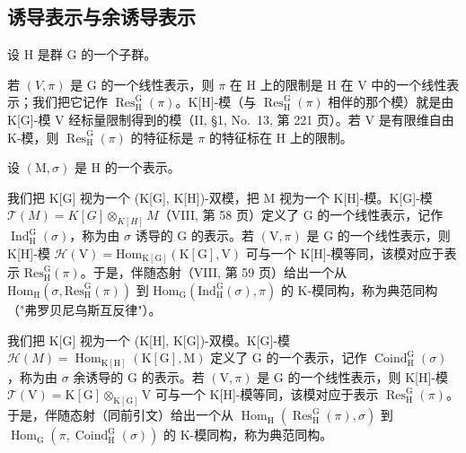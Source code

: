 \subsection{诱导表示与余诱导表示}

设 H 是群 G 的一个子群。

若 \((V,\pi)\) 是 G 的一个线性表示，则 \(\pi\) 在 H 上的限制是 H 在 V 中的一个线性表示；我们把它记作 \(\operatorname{Res}_{\mathrm{H}}^{\mathrm{G}}(\pi)\)。K{[}H{]}-模（与 \(\operatorname{Res}_{\mathrm{H}}^{\mathrm{G}}(\pi)\) 相伴的那个模）就是由 K{[}G{]}-模 V 经标量限制得到的模（II, §1, No.~13, 第 221 页）。若 V 是有限维自由 K-模，则 \(\operatorname{Res}_{\mathrm{H}}^{\mathrm{G}}(\pi)\) 的特征标是 \(\pi\) 的特征标在 H 上的限制。

设 \((\mathrm{M},\sigma)\) 是 H 的一个表示。

我们把 K{[}G{]} 视为一个 (K{[}G{]}, K{[}H{]})-双模，把 M 视为一个 K{[}H{]}-模。K{[}G{]}-模 \(\mathcal{T}(M) = K[G] \otimes_{K[H]} M\)（VIII, 第 58 页）定义了 G 的一个线性表示，记作 \(\operatorname{Ind}_{\mathrm{H}}^{\mathrm{G}}(\sigma)\)，称为由 \(\sigma\) 诱导的 G 的表示。若 \((\mathrm{V}, \pi)\) 是 G 的一个线性表示，则 K{[}H{]}-模 \(\mathcal{H}(\mathrm{V}) = \mathrm{Hom}_{\mathrm{K[G]}}(\mathrm{K[G]},\mathrm{V})\) 可与一个 K{[}H{]}-模等同，该模对应于表示 \(\mathrm{Res}_{\mathrm{H}}^{\mathrm{G}}(\pi)\)。于是，伴随态射（VIII, 第 59 页）给出一个从 \(\mathrm{Hom}_{\mathrm{H}}(\sigma ,\mathrm{Res}_{\mathrm{H}}^{\mathrm{G}}(\pi))\) 到 \(\mathrm{Hom}_{\mathrm{G}}(\mathrm{Ind}_{\mathrm{H}}^{\mathrm{G}}(\sigma),\pi)\) 的 K-模同构，称为典范同构（"弗罗贝尼乌斯互反律"）。

我们把 K{[}G{]} 视为一个 (K{[}H{]}, K{[}G{]})-双模。K{[}G{]}-模 \(\mathcal{H}(M) = \operatorname{Hom}_{\mathrm{K}[\mathrm{H}]}(\mathrm{K}[\mathrm{G}], \mathrm{M})\) 定义了 G 的一个表示，记作 \(\operatorname{Coind}_{\mathrm{H}}^{\mathrm{G}}(\sigma)\)，称为由 \(\sigma\) 余诱导的 G 的表示。若 \((\mathrm{V}, \pi)\) 是 G 的一个线性表示，则 K{[}H{]}-模 \(\mathcal{T}(\mathrm{V}) = \mathrm{K}[\mathrm{G}] \otimes_{\mathrm{K}[\mathrm{G}]} \mathrm{V}\) 可与一个 K{[}H{]}-模等同，该模对应于表示 \(\operatorname{Res}_{\mathrm{H}}^{\mathrm{G}}(\pi)\)。于是，伴随态射（同前引文）给出一个从 \(\operatorname{Hom}_{\mathrm{H}}(\operatorname{Res}_{\mathrm{H}}^{\mathrm{G}}(\pi), \sigma)\) 到 \(\operatorname{Hom}_{\mathrm{G}}(\pi, \operatorname{Coind}_{\mathrm{H}}^{\mathrm{G}}(\sigma))\) 的 K-模同构，称为典范同构。

